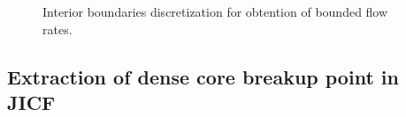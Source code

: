 \begin{figure}[ht]
     \centering
     \caption{Interior boundaries discretization for obtention of bounded flow rates.}
      \label{fig:jicf_IBs_sketch_discretization}
\end{figure}



%

\subsection{Extraction of dense core breakup point in JICF}
\label{subsec:ch5_jet_dense_core_extraction}

